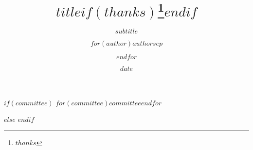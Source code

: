 \documentclass[$if(fontsize)$$fontsize$,$endif$$if(lang)$$babel-lang$,$endif$$if(papersize)$$papersize$paper,$endif$$if(beamer)$ignorenonframetext,$if(handout)$handout,$endif$$if(aspectratio)$aspectratio=$aspectratio$,$endif$$endif$$for(classoption)$$classoption$$sep$,$endfor$]{$documentclass$}
\title{$title$$if(thanks)$\thanks{$thanks$}$endif$}
\subtitle{$subtitle$}
\author{$for(author)$$author$$sep$ \and $endfor$}
\institute{$for(institute)$$institute$$sep$ \and $endfor$}
\date{$date$}
\begin{document}
\restoregeometry

\restoregeometry

\newcommand{\snukotitle}{$kotitle$}
\newcommand{\snukosubtitle}{$if(kosubtitle)$- $kosubtitle$$endif$}
\newcommand{\snuentitle}{$if(entitle)$\begin{english}$entitle$\end{english}$endif$}

\newcommand{\snukoauthor}{$koauthor$}
\newcommand{\snukoauthorrun}{$koauthorrun$}

\newcommand{\snukodegree}{$kodegree$}
\newcommand{\snukodepartment}{$kodepartment$}

\newcommand{\snukoadvisorrun}{$koadvisorrun$}


\newcommand{\snukograddate}{$graddate$}
\newcommand{\snukosubmissiondate}{$submissiondate$}
\newcommand{\snukoapprovaldate}{$approvaldate$}

\newcommand{\snucommitteememberA}{}
\newcommand{\snucommitteememberB}{}
\newcommand{\snucommitteememberC}{}
\newcommand{\snucommitteememberD}{}
\newcommand{\snucommitteememberE}{}

$if(committee)$
\newcommand{\snucommitteemembers}[5]{%
  \expandafter\renewcommand\csname snucommitteememberA\endcsname{#1}
  \expandafter\renewcommand\csname snucommitteememberB\endcsname{#2}
  \expandafter\renewcommand\csname snucommitteememberC\endcsname{#3}
  \expandafter\renewcommand\csname snucommitteememberD\endcsname{#4}
  \expandafter\renewcommand\csname snucommitteememberE\endcsname{#5}
}
\snucommitteemembers%
$for(committee)${$committee$}$endfor$

\newlength{\snuunderlinetmp}
\newlength{\snuunderlinetmpb}

\newcommand{\committeestyle}[1]{%
	\setlength{\snuunderlinetmp}{7cm}%
	\settowidth{\snuunderlinetmpb}{#1}%
	\addtolength{\snuunderlinetmp}{-\snuunderlinetmpb}%
	\divide \snuunderlinetmp by 2 %
	\underline{\hspace{\snuunderlinetmp}#1\hspace{\snuunderlinetmp} \hfill (인)}%
}

$else$
\newcommand{\committeestyle}[1]{%
	\underline{\hspace{7cm} \hfill (인)}%
}
$endif$
\end{document}
